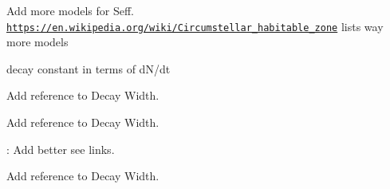 
\begin{DoxyRefList}
\item[\label{todo__todo000001}%
\Hypertarget{todo__todo000001}%
Namespace \mbox{\hyperlink{namespace_e_g_x_phys}{E\+G\+X\+Phys}} ]Add more models for Seff. \href{https://en.wikipedia.org/wiki/Circumstellar_habitable_zone}{\tt https\+://en.\+wikipedia.\+org/wiki/\+Circumstellar\+\_\+habitable\+\_\+zone} lists way more models 

decay constant in terms of d\+N/dt  
\item[\label{todo__todo000003}%
\Hypertarget{todo__todo000003}%
Module \mbox{\hyperlink{group___half_life}{Half\+Life}} ]Add reference to Decay Width.  
\item[\label{todo__todo000004}%
\Hypertarget{todo__todo000004}%
Module \mbox{\hyperlink{group___nuclear_binding_energy}{Nuclear\+Binding\+Energy}} ]Add reference to Decay Width.  
\item[\label{todo__todo000005}%
\Hypertarget{todo__todo000005}%
File \mbox{\hyperlink{_nuclear_separation_energy_8hpp}{Nuclear\+Separation\+Energy.hpp}} ]\+: Add better see links.  
\item[\label{todo__todo000006}%
\Hypertarget{todo__todo000006}%
Module \mbox{\hyperlink{group___semi_empirical_mass_formula}{Semi\+Empirical\+Mass\+Formula}} ]Add reference to Decay Width. 
\end{DoxyRefList}